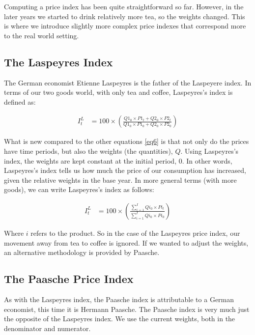 \documentclass[
]{book}
\begin{document}
Computing a price index has been quite straightforward so far. However, in the later years we started to drink relatively more tea, so the weights changed. This is where we introduce slightly more complex price indexes that correspond more to the real world setting.

\hypertarget{the-laspeyres-index}{%
\subsection{The Laspeyres Index}\label{the-laspeyres-index}}

The German economist Etienne Laspeyres is the father of the Laspeyere index. In terms of our two goods world, with only tea and coffee, Laspeyres's index is defined as:

\begin{align}
I_t^L&=100\times \left(\frac{Q1_0 \times P1_t+Q2_0 \times P2_t}{Q1_0 \times P1_0+Q2_0 \times P2_0}\right)
    \label{eq8}
\end{align}

What is new compared to the other equations \eqref{eq6} is that not only do the prices have time periods, but also the weights (the quantities), \(Q\). Using Laspeyres's index, the weights are kept constant at the initial period, 0. In other words, Laspeyres's index tells us how much the price of our consumption has increased, given the relative weights in the base year. In more general terms (with more goods), we can write Laspeyres's index as follows:

\begin{align}
   I_t^L&=100\times \left(\frac{\sum^I_{i=1} Qi_0 \times Pi_t}{\sum^I_{i=1}Qi_0 \times Pi_0}\right)
    \label{eq9}
\end{align}

Where \(i\) refers to the product. So in the case of the Laspeyres price index, our movement away from tea to coffee is ignored. If we wanted to adjust the weights, an alternative methodology is provided by Paasche.

\hypertarget{the-paasche-price-index}{%
\subsection{The Paasche Price Index}\label{the-paasche-price-index}}

As with the Laspeyres index, the Paasche index is attributable to a German economist, this time it is Hermann Paasche. The Paasche index is very much just the opposite of the Laspeyres index. We use the current weights, both in the denominator and numerator.
\end{document}
